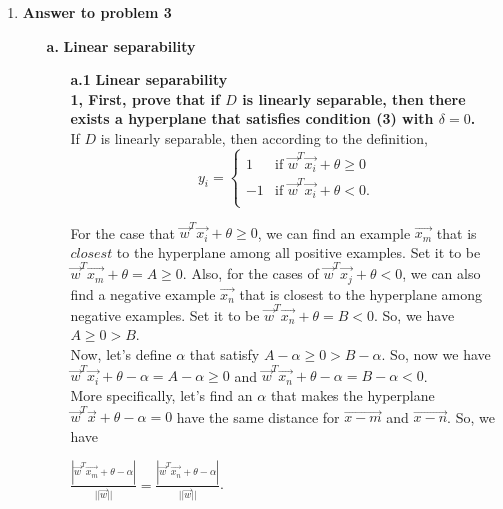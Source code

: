 \begin{enumerate}
\item {\bf Answer to problem 3}

\begin{enumerate}
\item[{\bf a.}] {\bf Linear separability}\\

\begin{enumerate}

\item[{\bf a.1 }] {\bf Linear separability}\\

{\bf 1, First, prove that if $D$ is linearly separable, then there exists a hyperplane that satisfies condition (3) with $\delta = 0$.}\\

If $D$ is linearly separable, then according to the definition, 
\begin{equation}
\label{eq:separable}
y_i = \begin{cases}
 1 & \mbox{if } \vec{w}^T \vec{x_i} + \theta \ge 0 \\
-1 & \mbox{if } \vec{w}^T \vec{x_i} + \theta < 0. \\
\end{cases}
\end{equation}

For the case that $\vec{w}^T \vec{x_i} + \theta \ge 0$, we can find an example $\vec{x_m}$ that is $closest$ to the hyperplane among all positive examples. Set it to be $\vec{w}^T \vec{x_m} + \theta = A \ge 0$. Also, for the cases of $\vec{w}^T \vec{x_j} + \theta < 0$, we can also find a negative example $\vec{x_n}$ that is closest to the hyperplane among negative examples. Set it to be $\vec{w}^T \vec{x_n} + \theta = B < 0$. So, we have $A \ge 0 > B$.\\

Now, let's define $\alpha$ that satisfy $A-\alpha \ge 0 > B - \alpha$. So, now we have $\vec{w}^T \vec{x_i} + \theta -\alpha = A - \alpha \ge 0 $ and $\vec{w}^T \vec{x_n} + \theta - \alpha = B - \alpha < 0$.\\

More specifically, let's find an $\alpha$ that makes the hyperplane $\vec{w}^T \vec{x} + \theta - \alpha = 0$ have the same distance for $\vec{x-m}$ and $\vec{x-n}$. So, we have
\begin{center}
$\frac{|\vec{w}^T \vec{x_m} + \theta - \alpha|}{||\vec{w}||} = \frac{|\vec{w}^T \vec{x_n} + \theta - \alpha|}{||\vec{w}||}$.
\end{center}


\end{enumerate}
\end{enumerate}
\end{enumerate}
